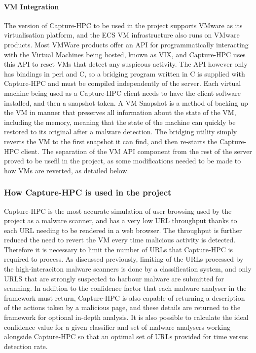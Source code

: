 \paragraph{VM Integration}
The version of Capture-HPC to be used in the project supports VMware as its
virtualisation platform, and the ECS VM infrastructure also runs on VMware
products. Most VMWare products offer an API for programmatically interacting
with the Virtual Machines being hosted, known as VIX, and Capture-HPC uses this
API to reset VMs that detect any suspicous activity. The API however only has
bindings in perl and C,
so a bridging program written in C is supplied with Capture-HPC and must be
compiled independently of the server. Each virtual machine being used as a
Capture-HPC client needs to have the client software installed, and then a
snapshot taken. A VM Snapshot is a method of backing up the VM in manner that
preserves all information about the state of the VM, including the memory,
meaning that the state of the machine can quickly be restored to its original
after a malware detection. The bridging utility simply reverts the VM to the
first snapshot it can find, and then re-starts the Capture-HPC client. The
separation of the VM API component from the rest of the server proved to be
usefil in the project, as some modifications needed to be made to how VMs are
reverted, as detailed below.

\subsubsection{How Capture-HPC is used in the project}

Capture-HPC is the most accurate simulation of user browsing used by the project
as a malware scanner, and has a very low URL throughput thanks to each URL
needing to be rendered in a web browser. The throughput is further reduced 
the need to revert the VM every time malicious activity is detected. Therefore
it is necessary to limit the number of URLs that Capture-HPC is required to
process. As discussed previously, limiting of the URLs processed by the
high-interaciton malware scanners 
is done by a classification system, and only URLS that are strongly suspected to
harbour malware are submitted for scanning. In addition to the confidence factor
that each malware analyser in the framework must return, Capture-HPC is also
capable of returning a description of the actions taken by a malicious page, and
these details are returned to the framework for optional in-depth analysis. It
is also possible to calculate the ideal confidence value for a given classifier
and set of malware analysers working alongside Capture-HPC so that an optimal
set of URLs provided for time versus detection rate.

